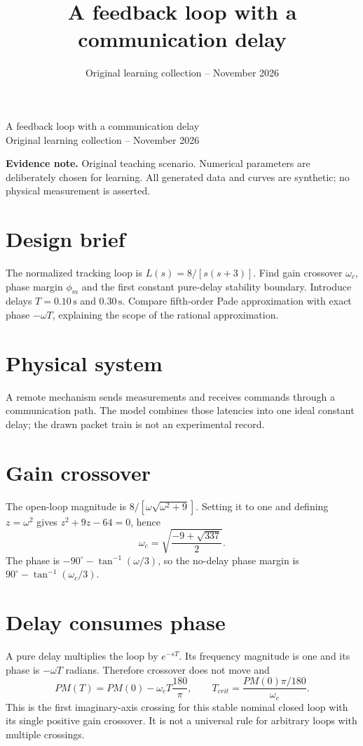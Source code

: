 \documentclass[10pt,a4paper]{article}
\title{\color{ink}A feedback loop with a communication delay}
\author{}
\date{Original learning collection -- November 2026}
\begin{document}
\begin{center}{\LARGE\color{ink}A feedback loop with a communication delay}\\[5pt]{\small Original learning collection -- November 2026}\end{center}

\textbf{Evidence note.} Original teaching scenario. Numerical parameters are deliberately chosen for learning. All generated data and curves are synthetic; no physical measurement is asserted.
\section{Design brief}
The normalized tracking loop is $L(s)=8/[s(s+3)]$. Find gain crossover $\omega_c$, phase margin $\phi_m$ and the first constant pure-delay stability boundary. Introduce delays $T=0.10\,\mathrm{s}$ and $0.30\,\mathrm{s}$. Compare fifth-order Pade approximation with exact phase $-\omega T$, explaining the scope of the rational approximation.
\section{Physical system}
\begin{center}\resizebox{.88\linewidth}{!}{}\par{\small A remote mechanism sends measurements and receives commands through a communication path. The model combines those latencies into one ideal constant delay; the drawn packet train is not an experimental record.}\end{center}
\section{Gain crossover}
The open-loop magnitude is $8/[\omega\sqrt{\omega^2+9}]$. Setting it to one and defining $z=\omega^2$ gives $z^2+9z-64=0$, hence
\[\omega_c=\sqrt{\frac{-9+\sqrt{337}}2}.\]
The phase is $-90^\circ-\tan^{-1}(\omega/3)$, so the no-delay phase margin is $90^\circ-\tan^{-1}(\omega_c/3)$.
\section{Delay consumes phase}
A pure delay multiplies the loop by $e^{-sT}$. Its frequency magnitude is one and its phase is $-\omega T$ radians. Therefore crossover does not move and
\[PM(T)=PM(0)-\omega_cT\frac{180}{\pi},\qquad T_{crit}=\frac{PM(0)\pi/180}{\omega_c}.\]
This is the first imaginary-axis crossing for this stable nominal closed loop with its single positive gain crossover. It is not a universal rule for arbitrary loops with multiple crossings.
\end{document}
